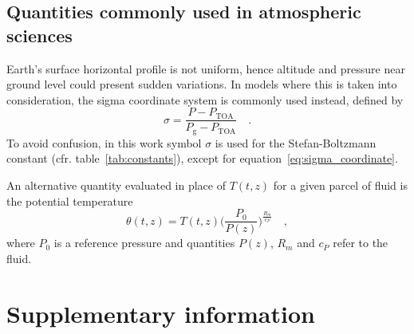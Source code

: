 \documentclass[a4paper,10pt,twocolumn,\classoptions]{article}
\newcommand{\PTOA}{P_\text{TOA}}
\begin{document}
\subsection{Quantities commonly used in atmospheric sciences}
\label{sec:Quantities commonly used in atmospheric sciences}
Earth's surface horizontal profile is not uniform, hence altitude and pressure near ground level could present sudden variations. In models where this is taken into consideration, the sigma coordinate system is commonly used instead, defined by
\begin{equation}
  \label{eq:sigma_coordinate}
  \sigma = \frac{P - \PTOA}{P_\text{g} - \PTOA}
  \quad .
\end{equation}
To avoid confusion, in this work symbol $\sigma$ is used for the Stefan-Boltzmann constant (cfr. table~\ref{tab:constants}), except for equation~\eqref{eq:sigma_coordinate}.

An alternative quantity evaluated in place of $T(t,z)$ for a given parcel of fluid is the potential temperature
\begin{equation}
  \label{eq:potential_temperature}
  \theta(t,z) = T(t,z) \bigg( \frac{P_0}{P(z)} \bigg)^\frac{R_m}{c_P}
  \quad ,
\end{equation}
where $P_0$ is a reference pressure and quantities $P(z)$, $R_m$ and $c_P$ refer to the fluid.



\section{Supplementary information}
\end{document}
